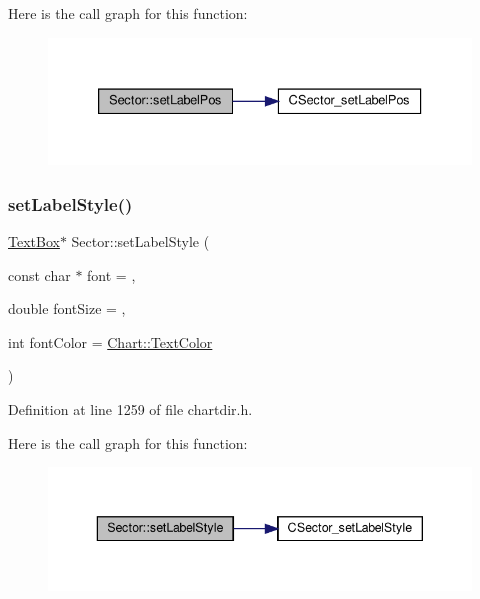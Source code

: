 Here is the call graph for this function\+:
\nopagebreak
\begin{figure}[H]
\begin{center}
\leavevmode
\includegraphics[width=333pt]{class_sector_ac09478340cba279b7cbaff69b5fc828f_cgraph}
\end{center}
\end{figure}
\mbox{\label{class_sector_ad9a4226a9824942b7d4d753f97a0f03b}} 
\subsubsection{\texorpdfstring{set\+Label\+Style()}{setLabelStyle()}}
{\footnotesize\ttfamily \hyperlink{class_text_box}{Text\+Box}$\ast$ Sector\+::set\+Label\+Style (\begin{DoxyParamCaption}\item[{const char $\ast$}]{font = {},  }\item[{double}]{font\+Size = {},  }\item[{int}]{font\+Color = {\ttfamily \hyperlink{namespace_chart_abee0d882fdc9ad0b001245ad9fc64011a879e14f2f5024caccc047374342321ef}{Chart\+::\+Text\+Color}} }\end{DoxyParamCaption})\hspace{0.3cm}{\ttfamily [inline]}}



Definition at line 1259 of file chartdir.\+h.

Here is the call graph for this function\+:
\nopagebreak
\begin{figure}[H]
\begin{center}
\leavevmode
\includegraphics[width=343pt]{class_sector_ad9a4226a9824942b7d4d753f97a0f03b_cgraph}
\end{center}
\end{figure}
\mbox{\label{class_sector_a77d33f22f2a3b3e526c848ce17ff82d6}} 
